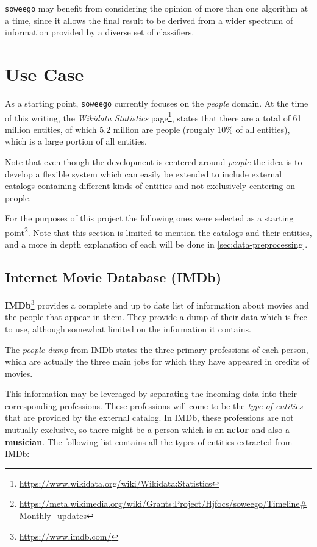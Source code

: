 \documentclass[epsfig,a4paper,11pt,titlepage,twoside,openany]{book}
\newcommand{\footurl}[1]{\footnote{\url{#1}}}
\begin{document}
\texttt{soweego} may benefit from considering the opinion of more than one algorithm at a time, since it allows the final result to be derived from a wider spectrum of information provided by a diverse set of classifiers.



\section{Use Case}
\label{sec:statement-use-case}

As a starting point, \texttt{soweego} currently focuses on the \textit{people} domain. At the time of this writing, the \textit{Wikidata Statistics} page\footurl{https://www.wikidata.org/wiki/Wikidata:Statistics}, states that there are a total of 61 million entities, of which 5.2 million are people (roughly 10\% of all entities), which is a large portion of all entities. 

Note that even though the development is centered around \textit{people} the idea is to develop a flexible system which can easily be extended to include external catalogs containing different kinds of entities and not exclusively centering on people. 

For the purposes of this project the following ones were selected as a starting point\footurl{https://meta.wikimedia.org/wiki/Grants:Project/Hjfocs/soweego/Timeline\#Monthly\_updates}. Note that this section is limited to mention the catalogs and their entities, and a more in depth explanation of each will be done in \autoref{sec:data-preprocessing}. 



\subsection{Internet Movie Database (IMDb)}
\label{sec:catalog-imdb}

\textbf{IMDb}\footurl{https://www.imdb.com/} provides a complete and up to date list of information about movies and the people that appear in them. They provide a dump of their data which is free to use, although somewhat limited on the information it contains.

The \textit{people dump} from IMDb states the three primary professions of each person, which are actually the three main jobs for which they have appeared in credits of movies. 


This information may be leveraged by separating the incoming data into their corresponding professions. These professions will come to be the \textit{type of entities} that are provided by the external catalog. In IMDb, these professions are not mutually exclusive, so there might be a person which is an \textbf{actor} and also a \textbf{musician}. The following list contains all the types of entities extracted from IMDb: 
\end{document}
